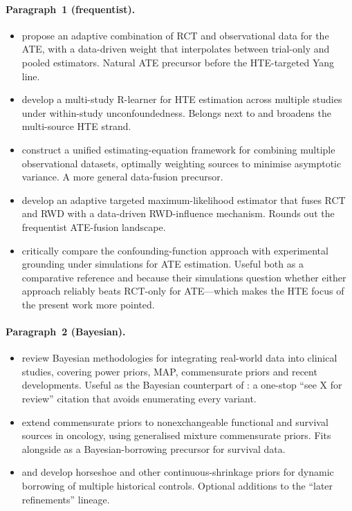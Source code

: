 \documentclass[11pt]{article}
\begin{document}
\paragraph{Paragraph~1 (frequentist).}
\begin{itemize}
  \item \citet{chengcai2021adaptive} propose an adaptive combination of RCT and observational data for the ATE, with a data-driven weight that interpolates between trial-only and pooled estimators. Natural ATE precursor before the HTE-targeted Yang line.
  \item \citet{shyr2025multi} develop a multi-study R-learner for HTE estimation across multiple studies under within-study unconfoundedness. Belongs next to \citet*{wu2022integrative} and broadens the multi-source HTE strand.
  \item \citet{yangding2020combining} construct a unified estimating-equation framework for combining multiple observational datasets, optimally weighting sources to minimise asymptotic variance. A more general data-fusion precursor.
  \item \citet{vanderlaan2024adaptive} develop an adaptive targeted maximum-likelihood estimator that fuses RCT and RWD with a data-driven RWD-influence mechanism. Rounds out the frequentist ATE-fusion landscape.
  \item \citet{lintarpevans2024fusion} critically compare the confounding-function approach with experimental grounding under simulations for ATE estimation. Useful both as a comparative reference and because their simulations question whether either approach reliably beats RCT-only for ATE---which makes the HTE focus of the present work more pointed.
\end{itemize}

\paragraph{Paragraph~2 (Bayesian).}
\begin{itemize}
  \item \citet{muller2023bayesian} review Bayesian methodologies for integrating real-world data into clinical studies, covering power priors, MAP, commensurate priors and recent developments. Useful as the Bayesian counterpart of \citet{colnet2024causal}: a one-stop ``see X for review'' citation that avoids enumerating every variant.
  \item \citet{murray2015combining} extend commensurate priors to nonexchangeable functional and survival sources in oncology, using generalised mixture commensurate priors. Fits alongside \citet*{alt2025control} as a Bayesian-borrowing precursor for survival data.
  \item \citet{ohigashi2022horseshoe} and \citet{ohigashi2025potential} develop horseshoe and other continuous-shrinkage priors for dynamic borrowing of multiple historical controls. Optional additions to the ``later refinements'' lineage.
\end{itemize}
\end{document}
